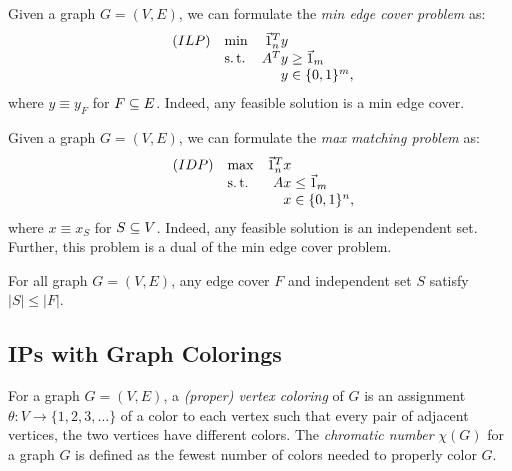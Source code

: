 \begin{defn}
    \label{def:min-edge-cover-formulation}
    Given a graph $G=(V,E)$, we can formulate the \textit{min edge cover problem} as:
        \begin{equation*}
        \begin{array}{llr@{}l@{}}
            (ILP)   & \min  &   \one_n^T y  &               \\
                    & \st   &       A^T y   &{}\ge \one_m   \\
                    &       &       y       &{}\in \{0,1\}^m,
        \end{array}
        \end{equation*}
    where $y \equiv y_F$ for $F \subseteq E$. Indeed, any feasible solution is a min edge cover.
\end{defn}

\begin{defn}
    \label{def:max-ind-set-formulation}
    Given a graph $G=(V,E)$, we can formulate the \textit{max matching problem} as:
        \begin{equation*}
        \begin{array}{llr@{}l@{}}
            (IDP)   & \max  &   \one_n^T x  &               \\
                    & \st   &       Ax      &{}\le \one_m   \\
                    &       &       x       &{}\in \{0,1\}^n,
        \end{array}
        \end{equation*}
    where $x \equiv x_S$ for $S \subseteq V$. Indeed, any feasible solution is an independent set. Further, this problem is a dual of the min edge cover problem.
\end{defn}

\begin{thm}
    \label{thm:weak-duality-min-edge-cover-max-ind-set}
    For all graph $G = (V,E)$, any edge cover $F$ and independent set $S$ satisfy $|S| \le |F|$.
\end{thm}


\subsection{IPs with Graph Colorings}
\begin{defn}
    \label{def:vertex-coloring}
    For a graph $G = (V,E)$, a \textit{(proper) vertex coloring} of $G$ is an assignment $\theta: V \rightarrow \{1, 2, 3, \dots\}$ of a color to each vertex such that every pair of adjacent vertices, the two vertices have different colors. The \textit{chromatic number} $\chi(G)$ for a graph $G$ is defined as the fewest number of colors needed to properly color $G$.
\end{defn}

